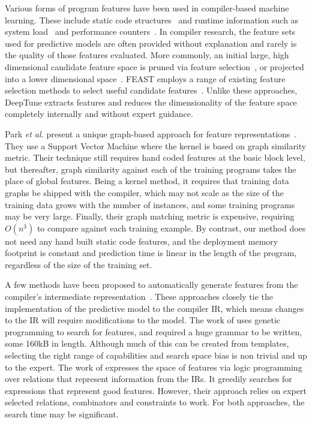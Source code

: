 Various forms of program features have been used in compiler-based machine learning. These include static code structures~\cite{Jiang2010} and runtime information such as system load~\cite{Wen2015} and performance counters~\cite{Dubach2009}. In compiler research, the feature sets used for predictive models are often provided without explanation and rarely is the quality of those features evaluated. More commonly, an initial large, high dimensional candidate feature space is pruned via feature selection~\cite{Stephenson2005}, or projected into a lower dimensional space~\cite{Collins2013,Dubach2007}. FEAST employs a range of existing feature selection methods to select useful candidate features~\cite{Ting2016}. Unlike these approaches, DeepTune extracts features and reduces the dimensionality of the feature space completely internally and without expert guidance.

Park \emph{et al.} present a unique graph-based approach for feature representations~\cite{Park2012}. They use a Support Vector Machine where the kernel is based on graph similarity metric. Their technique still requires hand coded features at the basic block level, but thereafter, graph similarity against each of the training programs takes the place of global features. Being a kernel method, it requires that training data graphs be shipped with the compiler, which may not scale as the size of the training data grows with the number of instances, and some training programs may be very large. Finally, their graph matching metric is expensive, requiring $O(n^3)$ to compare against each training example. By contrast, our method does not need any hand built static code features, and the deployment memory footprint is constant and prediction time is linear in the length of the program, regardless of the size of the training set.

A few methods have been proposed to automatically generate features from the compiler's intermediate representation~\cite{Namolaru2010a,Leather2014}. These approaches closely tie the implementation of the predictive model to the compiler IR, which means changes to the IR will require modifications to the model. The work of \cite{Leather2014} uses genetic programming to search for features, and required a huge grammar to be written, some 160kB in length. Although much of this can be created from templates, selecting the right range of capabilities and search space bias is non trivial and up to the expert. The work of \cite{Namolaru2010a} expresses the space of features via logic programming over relations that represent information from the IRs. It greedily searches for expressions that represent good features. However, their approach relies on expert selected relations, combinators and constraints to work. For both approaches, the search time may be significant.

